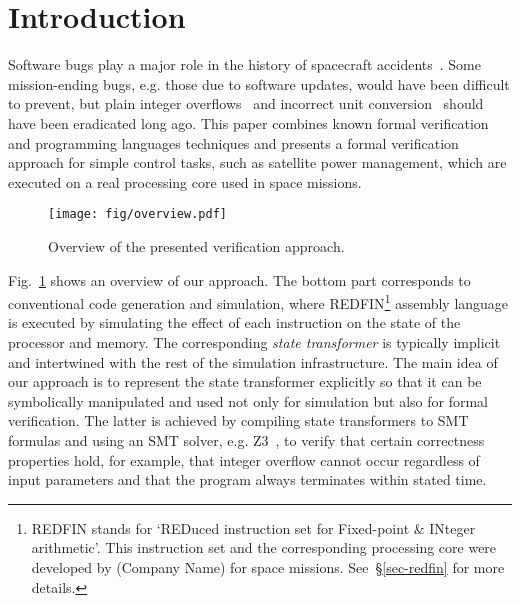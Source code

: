 \section{Introduction}\label{sec-intro}
Software bugs play a major role in the history of spacecraft
accidents~\cite{Leveson2004}. Some mission-ending bugs, e.g. those due to
software updates, would have been difficult to prevent, but plain integer
overflows~\cite{bug-rocket} and incorrect unit
conversion~\cite{NASA:1999:Mars} should have been eradicated long ago.
This paper
combines known formal verification and programming languages techniques and presents
a formal verification approach for simple control tasks, such as satellite power
management, which are executed on a real processing core used in space missions.



\begin{figure}
\centerline{\texttt{[image: fig/overview.pdf]}}
\caption{Overview of the presented verification approach.\label{fig-overview}}
\end{figure}

Fig.~\ref{fig-overview} shows an overview of our approach. The bottom part
corresponds to conventional code generation and simulation, where
REDFIN\footnote{REDFIN stands for `REDuced instruction set for Fixed-point \&
INteger arithmetic'. This instruction set and the corresponding processing core
were developed by (Company Name) for space missions.
See~\S\ref{sec-redfin} for more details.} assembly language is executed by
simulating the effect of each instruction on the state of the processor and memory.
The corresponding \emph{state transformer} is typically implicit and intertwined
with the rest of the simulation infrastructure. The main idea of our approach is
to represent the state transformer explicitly so that it can be symbolically
manipulated and used not only for simulation but also for formal verification.
The latter is achieved by compiling state transformers to SMT formulas and using
an SMT solver, e.g. Z3~\cite{de2008z3}, to verify that certain correctness
properties hold, for example, that integer overflow cannot occur regardless of
input parameters and that the program always terminates within stated time.

